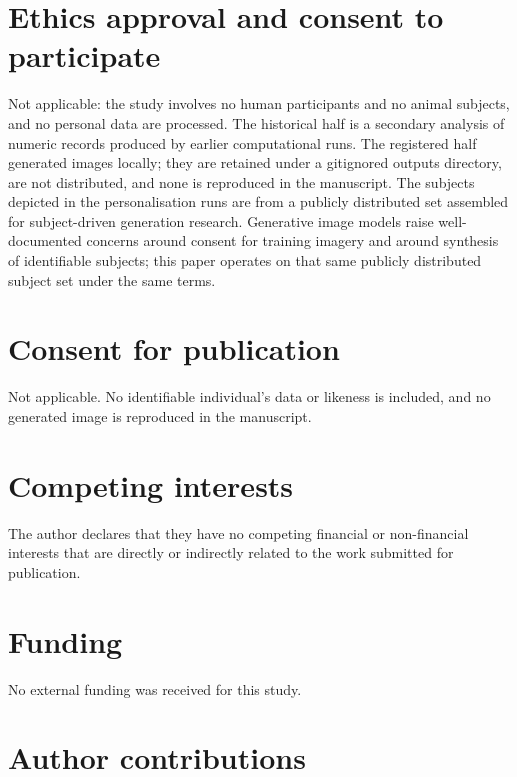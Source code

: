 \section*{Ethics approval and consent to participate}

Not applicable: the study involves no human participants and no animal
subjects, and no personal data are processed. The historical half is a
secondary analysis of numeric records produced by earlier computational runs.
The registered half generated \DesignGenerations{} images locally; they are
retained under a gitignored outputs directory, are not distributed, and none
is reproduced in the manuscript. The subjects depicted in the personalisation
runs are from a publicly distributed set assembled for subject-driven
generation research. Generative image models raise well-documented concerns
around consent for training imagery and around synthesis of identifiable
subjects; this paper operates on that same publicly distributed subject set
under the same terms.

\section*{Consent for publication}

Not applicable. No identifiable individual's data or likeness is included,
and no generated image is reproduced in the manuscript.

\section*{Competing interests}

The author declares that they have no competing financial or non-financial
interests that are directly or indirectly related to the work submitted for
publication.

\section*{Funding}

No external funding was received for this study.

\section*{Author contributions}

